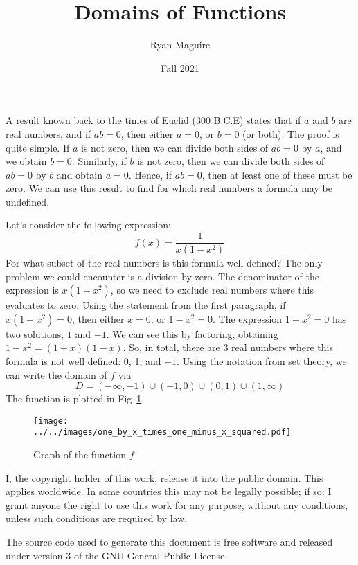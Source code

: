 \documentclass{article}
\title{Domains of Functions}
\author{Ryan Maguire}
\date{Fall 2021}
\begin{document}
    \maketitle
    A result known back to the times of Euclid (300 B.C.E) states that if
    $a$ and $b$ are real numbers, and if $ab=0$, then either $a=0$, or
    $b=0$ (or both). The proof is quite simple. If $a$ is not zero, then
    we can divide both sides of $ab=0$ by $a$, and we obtain $b=0$. Similarly,
    if $b$ is not zero, then we can divide both sides of $ab=0$ by $b$ and
    obtain $a=0$. Hence, if $ab=0$, then at least one of these must be zero.
    We can use this result to find for which real numbers a formula may be
    undefined.
    \par\hfill\par
    Let's consider the following expression:
    \begin{equation}
        f(x)=\frac{1}{x(1-x^{2})}
    \end{equation}
    For what subset of the real numbers is this formula well defined? The only
    problem we could encounter is a division by zero. The denominator of the
    expression is $x(1-x^{2})$, so we need to exclude real numbers where this
    evaluates to zero. Using the statement from the first paragraph, if
    $x(1-x^{2})=0$, then either $x=0$, or $1-x^{2}=0$. The expression
    $1-x^{2}=0$ has two solutions, $1$ and $-1$. We can see this by factoring,
    obtaining $1-x^{2}=(1+x)(1-x)$. So, in total, there are 3 real numbers
    where this formula is not well defined: 0, 1, and $-1$. Using the notation
    from set theory, we can write the domain of $f$ via
    \begin{equation}
        D=(-\infty,-1)\cup(-1,0)\cup(0,1)\cup(1,\infty)
    \end{equation}
    The function is plotted in Fig~\ref{fig:graph_of_f}.
    \begin{figure}
        \centering
        \texttt{[image: ../../images/one\_by\_x\_times\_one\_minus\_x\_squared.pdf]}
        \caption{Graph of the function $f$}
        \label{fig:graph_of_f}
    \end{figure}
    \newpage
    I, the copyright holder of this work, release it into the public domain.
    This applies worldwide. In some countries this may not be legally possible;
    if so: I grant anyone the right to use this work for any purpose, without
    any conditions, unless such conditions are required by law.
    \par\hfill\par
    The source code used to generate this document is free software and released
    under version 3 of the GNU General Public License.
\end{document}
